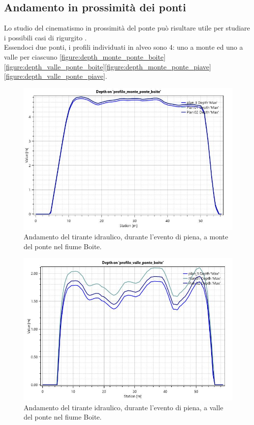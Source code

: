 \subsection{Andamento in prossimità dei ponti}
Lo studio del cinematismo in prossimità del ponte può risultare utile per studiare i possibili casi di rigurgito \cite{rigurgito}.\\
Essendoci due ponti, i profili individuati in alveo sono 4: uno a monte ed uno a valle per ciascuno \eqref{figure:depth_monte_ponte_boite}\eqref{figure:depth_valle_ponte_boite}\eqref{figure:depth_monte_ponte_piave}\eqref{figure:depth_valle_ponte_piave}.

\begin{figure}[htb] \centering
    \includegraphics[scale=0.5]{immagini/depth_monte_ponte_boite.JPG}
    \caption{Andamento del tirante idraulico, durante l'evento di piena, a monte del ponte nel fiume Boite.}
    \label{figure:depth_monte_ponte_boite}
\end{figure}

\begin{figure}[htb] \centering
    \includegraphics[scale=0.5]{immagini/depth_valle_ponte_boite.JPG}
    \caption{Andamento del tirante idraulico, durante l'evento di piena, a valle del ponte nel fiume Boite.}
    \label{figure:depth_valle_ponte_boite}
\end{figure}


